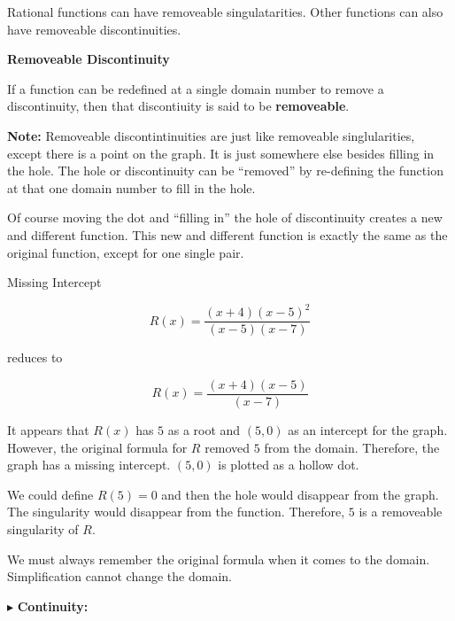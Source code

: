 \documentclass{ximera}
\begin{document}
Rational functions can have removeable singulatarities. Other functions can also have removeable discontinuities.

\begin{definition} \textbf{\textcolor{green!50!black}{Removeable Discontinuity}}

If a function can be redefined at a single domain number to remove a discontinuity, then that discontiuity is said to be \textbf{removeable}.

\end{definition}

\textbf{Note:} Removeable discontintinuities are just like removeable singlularities, except there is a point on the graph.  It is just somewhere else besides filling in the hole.  The hole or discontinuity can be ``removed'' by re-defining the function at that one domain number to fill in the hole.

Of course moving the dot and ``filling in'' the hole of discontinuity creates a new and different function.  This new and different function is exactly the same as the original function, except for one single pair.






\begin{example}  Missing Intercept

\[     R(x) = \frac{(x+4)(x-5)^2}{(x-5)(x-7)}     \]

reduces to 

\[     R(x) = \frac{(x+4)(x-5)}{(x-7)}     \]


It appears that $R(x)$ has $5$ as a root and $(5,0)$ as an intercept for the graph.  However, the original formula for $R$ removed $5$ from the domain.  Therefore, the graph has a missing intercept. $(5,0)$ is plotted as a hollow dot.



We could define $R(5)=0$ and then the hole would disappear from the graph.  The singularity would disappear from the function. Therefore, $5$ is a removeable singularity of $R$.


\end{example}

We must always remember the original formula when it comes to the domain.  Simplification cannot change the domain. 





$\blacktriangleright$ \textbf{\textcolor{red!10!blue!90!}{Continuity:}} 
\end{document}
